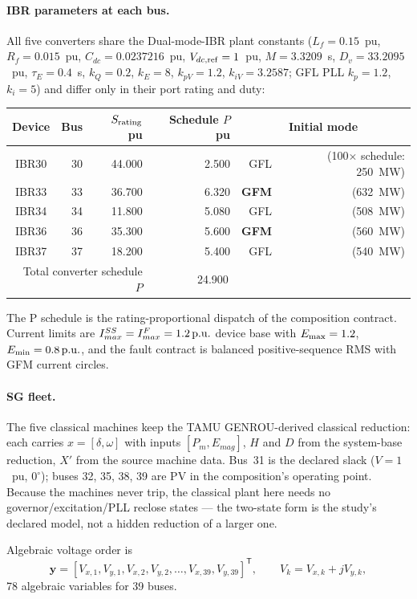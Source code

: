 \documentclass[12pt,a4paper]{article}
\newcommand{\pu}{\ifmmode\,\mathrm{p.u.}\else\ p.u.\fi}
\newcommand{\vect}[1]{\boldsymbol{#1}}
\begin{document}
\paragraph{IBR parameters at each bus.}  All five converters share the
Dual-mode-IBR plant constants ($L_f=0.15$~pu, $R_f=0.015$~pu,
$C_{dc}=0.0237216$~pu, $V_{dc,\rm ref}=1$~pu, $M=3.3209$~s,
$D_v=33.2095$~pu, $\tau_E=0.4$~s, $k_Q=0.2$, $k_E=8$, $k_{pV}=1.2$,
$k_{iV}=3.2587$; GFL PLL $k_p=1.2$, $k_i=5$) and differ only in their port
rating and duty:
\begin{center}\footnotesize
\begin{tabular}{crrrrr}
\toprule
Device & Bus & $S_{\rm rating}$ pu & Schedule $P$ pu & \multicolumn{2}{c}{Initial mode}\\
\midrule
IBR30 & 30 & 44.000 & 2.500 & GFL & (100$\times$ schedule: 250~MW)\\
IBR33 & 33 & 36.700 & 6.320 & \textbf{GFM} & (632~MW)\\
IBR34 & 34 & 11.800 & 5.080 & GFL & (508~MW)\\
IBR36 & 36 & 35.300 & 5.600 & \textbf{GFM} & (560~MW)\\
IBR37 & 37 & 18.200 & 5.400 & GFL & (540~MW)\\
\midrule
\multicolumn{3}{r}{Total converter schedule $P$} & \multicolumn{2}{c}{24.900}\\
\bottomrule
\end{tabular}
\end{center}
The P schedule is the rating-proportional dispatch of the composition
contract.  Current limits are $I_{max}^{SS}=I_{max}^{F}=1.2\pu$ device base with
$E_{\rm max}=1.2$, $E_{\rm min}=0.8\pu$, and the fault contract is balanced
positive-sequence RMS with GFM current circles.

\paragraph{SG fleet.}  The five classical machines keep the TAMU GENROU-derived
classical reduction: each carries $x=[\delta,\omega]$ with inputs $[P_m,E_{mag}]$,
$H$ and $D$ from the system-base reduction, $X'$ from the source machine data.
Bus~31 is the declared slack ($V=1$~pu, $0^\circ$); buses 32, 35, 38, 39 are PV
in the composition's operating point.  Because the machines never trip, the
classical plant here needs no governor/excitation/PLL reclose states --- the
two-state form is the study's declared model, not a hidden reduction of a
larger one.

Algebraic voltage order is
\[
\vect y=[V_{x,1},V_{y,1},V_{x,2},V_{y,2},\ldots,V_{x,39},V_{y,39}]^{\mathsf T},
\qquad V_k=V_{x,k}+jV_{y,k},
\]
78 algebraic variables for 39 buses.
\end{document}
